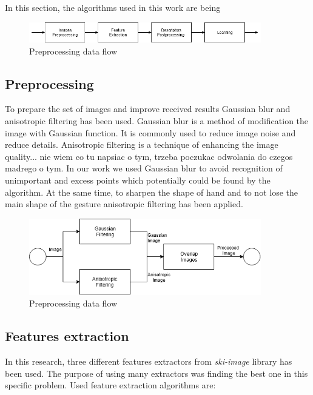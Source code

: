 \documentclass[11pt,a4paper]{article}
\begin{document}
	In this section, the algorithms used in this work are being
	\begin{figure}[H]
		\centering
		\includegraphics[width=0.9\textwidth]{Algorithm.png}
		\caption{Preprocessing data flow}
		\label{fig:Algorithm}
	\end{figure} 

\subsection{Preprocessing}
	
	To prepare the set of images and improve received results Gaussian blur and anisotropic filtering has been used. Gaussian blur is a method of modification the image with Gaussian function. It is commonly used to reduce image noise and reduce details. Anisotropic filtering is a technique of enhancing the image quality... nie wiem co tu napsiac o tym, trzeba poczukac odwolania do czegos madrego o tym. In our work we used Gaussian blur to avoid recognition of unimportant and excess points which potentially could be found by the algorithm. At the same time, to sharpen the shape of hand and to not lose the main shape of the gesture anisotropic filtering has been applied.
	
	
	\begin{figure}[H]
		\centering
		\includegraphics[width=0.9\textwidth]{Preprocessing.png}
		\caption{Preprocessing data flow}
		\label{fig:Preprocessing}
	\end{figure}

\subsection{Features extraction}

In this research, three different features extractors from \textit{ski-image} library has been used. The purpose of using many extractors was finding the best one in this specific problem. Used feature extraction algorithms are:
\end{document}
